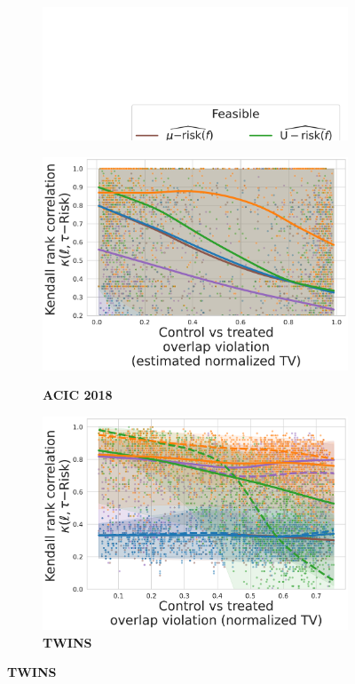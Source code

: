 \documentclass[a4paper,num-refs]{oup-contemporary}%
\begin{document}
\begin{figure}
\begin{subfigure}[b]{0.44\textwidth}
        \label{fig:ranking_agreement_tau_risk_acic_2016}
    \end{subfigure}
    \hfill
    \begin{subfigure}[b]{0.10\textwidth}
        \centering
        \includegraphics[width=1.5\textwidth]{legend_metrics.pdf}
    \end{subfigure}
    \begin{subfigure}[b]{0.44\textwidth}
        \centering
        \caption{\textbf{ACIC 2018}}
        \includegraphics[width=\textwidth]{ktau_acic2018_nuisance_stacking_models_hgb_tset_50.pdf}
        \label{fig:ranking_agreement_w_tau_risk_acic_2018}
    \end{subfigure}
    \hfill
    \begin{subfigure}[b]{0.44\textwidth}
        \centering
        \caption{\textbf{TWINS}}
        \includegraphics[width=\textwidth]{ktau_twins_nuisance_stacking__models_hgb.pdf}

\end{subfigure}
\end{figure}
\end{document}

